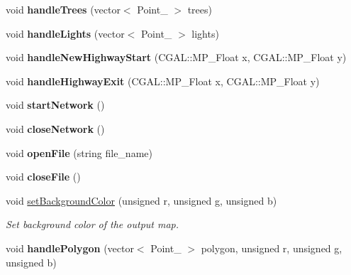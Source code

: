 \begin{DoxyCompactItemize}
\hypertarget{class_post_script_int_writer_aab4c0b129676f0c120acd1888f3b3cac}{}\label{class_post_script_int_writer_aab4c0b129676f0c120acd1888f3b3cac} 
void {\bfseries handle\+Trees} (vector$<$ Point\+\_ $>$ trees)
\item 
\hypertarget{class_post_script_int_writer_a9c563b05ac9aa1cca1d9f9f8318c676b}{}\label{class_post_script_int_writer_a9c563b05ac9aa1cca1d9f9f8318c676b} 
void {\bfseries handle\+Lights} (vector$<$ Point\+\_ $>$ lights)
\item 
\hypertarget{class_post_script_int_writer_ab3b394c6e8e0f71bd9b4ac859ea961a7}{}\label{class_post_script_int_writer_ab3b394c6e8e0f71bd9b4ac859ea961a7} 
void {\bfseries handle\+New\+Highway\+Start} (C\+G\+A\+L\+::\+M\+P\+\_\+\+Float x, C\+G\+A\+L\+::\+M\+P\+\_\+\+Float y)
\item 
\hypertarget{class_post_script_int_writer_a33016680eb1388e3beab4bae0305e8a9}{}\label{class_post_script_int_writer_a33016680eb1388e3beab4bae0305e8a9} 
void {\bfseries handle\+Highway\+Exit} (C\+G\+A\+L\+::\+M\+P\+\_\+\+Float x, C\+G\+A\+L\+::\+M\+P\+\_\+\+Float y)
\item 
\hypertarget{class_post_script_int_writer_a042a255dc892a2b80936cbf29fb98583}{}\label{class_post_script_int_writer_a042a255dc892a2b80936cbf29fb98583} 
void {\bfseries start\+Network} ()
\item 
\hypertarget{class_post_script_int_writer_a89ab69da091fa23ceaf89088434fc336}{}\label{class_post_script_int_writer_a89ab69da091fa23ceaf89088434fc336} 
void {\bfseries close\+Network} ()
\item 
\hypertarget{class_post_script_int_writer_a7dbf0010930eec0d32dea5649543cc22}{}\label{class_post_script_int_writer_a7dbf0010930eec0d32dea5649543cc22} 
void {\bfseries open\+File} (string file\+\_\+name)
\item 
\hypertarget{class_post_script_int_writer_a5517205d711934002df7a2d62845e146}{}\label{class_post_script_int_writer_a5517205d711934002df7a2d62845e146} 
void {\bfseries close\+File} ()
\item 
\hypertarget{class_post_script_int_writer_acb0d2680c26b21a72cc73e0d08f32b48}{}\label{class_post_script_int_writer_acb0d2680c26b21a72cc73e0d08f32b48} 
void \hyperlink{class_post_script_int_writer_acb0d2680c26b21a72cc73e0d08f32b48}{set\+Background\+Color} (unsigned r, unsigned g, unsigned b)
\begin{DoxyCompactList}\small\item\em Set background color of the output map. \end{DoxyCompactList}\item 
\hypertarget{class_post_script_int_writer_adcf1427848633c48d76b6c6bd6b64067}{}\label{class_post_script_int_writer_adcf1427848633c48d76b6c6bd6b64067} 
void {\bfseries handle\+Polygon} (vector$<$ Point\+\_ $>$ polygon, unsigned r, unsigned g, unsigned b)
\end{DoxyCompactItemize}


